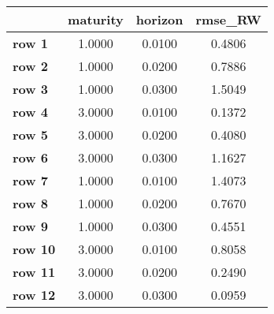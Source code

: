 \begin{tiny}\begin{tabular}{|l|c|c|c|}
\hline
&\textbf{maturity}&\textbf{horizon}&\textbf{rmse_RW}\\\hline
\textbf{row 1}&1.0000&0.0100&0.4806\\\hline
\textbf{row 2}&1.0000&0.0200&0.7886\\\hline
\textbf{row 3}&1.0000&0.0300&1.5049\\\hline
\textbf{row 4}&3.0000&0.0100&0.1372\\\hline
\textbf{row 5}&3.0000&0.0200&0.4080\\\hline
\textbf{row 6}&3.0000&0.0300&1.1627\\\hline
\textbf{row 7}&1.0000&0.0100&1.4073\\\hline
\textbf{row 8}&1.0000&0.0200&0.7670\\\hline
\textbf{row 9}&1.0000&0.0300&0.4551\\\hline
\textbf{row 10}&3.0000&0.0100&0.8058\\\hline
\textbf{row 11}&3.0000&0.0200&0.2490\\\hline
\textbf{row 12}&3.0000&0.0300&0.0959\\\hline
\end{tabular}
\end{tiny}